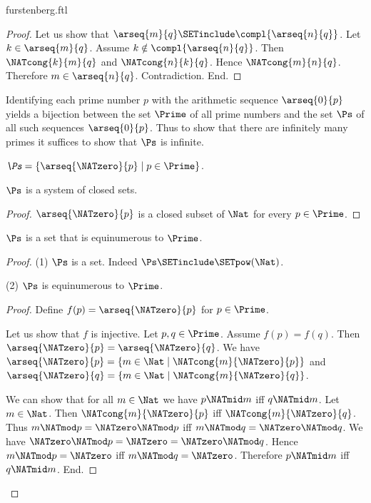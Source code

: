 \documentclass{article}
\begin{document}
\begin{smodule}{furstenberg.ftl}
\begin{forthel}
\begin{proof}
    Let us show that $\arseq{m}{q} \SETinclude \compl{\arseq{n}{q}}$.
      Let $k \in \arseq{m}{q}$.
      Assume $k \notin \compl{\arseq{n}{q}}$.
      Then $\NATcong{k}{m}{q}$ and $\NATcong{n}{k}{q}$.
      Hence $\NATcong{m}{n}{q}$.
      Therefore $m \in \arseq{n}{q}$.
      Contradiction.
    End.
  \end{proof}
\end{forthel}

Identifying each prime number $p$ with the arithmetic sequence $\arseq{0}{p}$
yields a bijection between the set $\Prime$ of all prime numbers and the set
$\Ps$ of all such sequences $\arseq{0}{p}$.
Thus to show that there are infinitely many primes it suffices to show that
$\Ps$ is infinite.

\begin{forthel}
  \begin{definition}
    $\emph{\Ps} = \{ \arseq{\NATzero}{p} \mid p \in \Prime \}$.
  \end{definition}

  \begin{lemma}
    $\Ps$ is a system of closed sets.
  \end{lemma}
  \begin{proof}
    $\arseq{\NATzero}{p}$ is a closed subset of $\Nat$ for every $p \in \Prime$.
  \end{proof}

  \begin{lemma}
    $\Ps$ is a set that is equinumerous to $\Prime$.
  \end{lemma}
  \begin{proof}
    (1) $\Ps$ is a set.
    Indeed $\Ps \SETinclude \SETpow(\Nat)$.

    (2) $\Ps$ is equinumerous to $\Prime$.
    \begin{proof}
      Define $f(p) = \arseq{\NATzero}{p}$ for $p \in \Prime$.

      Let us show that $f$ is injective.
        Let $p, q \in \Prime$.
        Assume $f(p) = f(q)$.
        Then $\arseq{\NATzero}{p} = \arseq{\NATzero}{q}$.
        We have $\arseq{\NATzero}{p} = \{ m \in \Nat \mid \NATcong{m}{\NATzero}{p} \}$ and
        $\arseq{\NATzero}{q} = \{ m \in \Nat \mid \NATcong{m}{\NATzero}{q} \}$.

        We can show that for all $m \in \Nat$ we have $p \NATmid m$ iff $q \NATmid m$.
          Let $m \in \Nat$.
          Then $\NATcong{m}{\NATzero}{p}$ iff $\NATcong{m}{\NATzero}{q}$.
          Thus $m \NATmod p = \NATzero \NATmod p$ iff $m \NATmod q = \NATzero \NATmod q$.
          We have $\NATzero \NATmod p = \NATzero = \NATzero \NATmod q$.
          Hence $m \NATmod p = \NATzero$ iff $m \NATmod q = \NATzero$.
          Therefore $p \NATmid m$ iff $q \NATmid m$.
        End.


\end{proof}
\end{proof}
\end{forthel}
\end{smodule}
\end{document}
